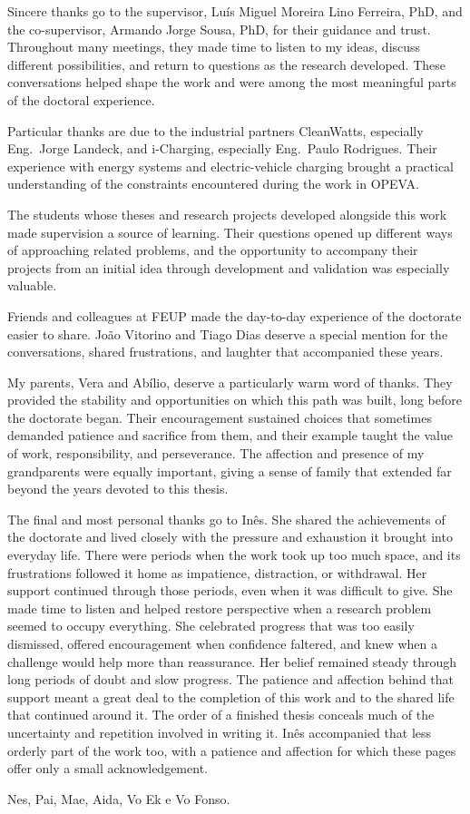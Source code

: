 
Sincere thanks go to the supervisor, Luís Miguel Moreira Lino Ferreira, PhD, and the co-supervisor, Armando Jorge Sousa, PhD, for their guidance and trust. Throughout many meetings, they made time to listen to my ideas, discuss different possibilities, and return to questions as the research developed. These conversations helped shape the work and were among the most meaningful parts of the doctoral experience.

Particular thanks are due to the industrial partners CleanWatts, especially Eng.~Jorge Landeck, and i-Charging, especially Eng.~Paulo Rodrigues. Their experience with energy systems and electric-vehicle charging brought a practical understanding of the constraints encountered during the work in OPEVA.

The students whose theses and research projects developed alongside this work made supervision a source of learning. Their questions opened up different ways of approaching related problems, and the opportunity to accompany their projects from an initial idea through development and validation was especially valuable.


Friends and colleagues at FEUP made the day-to-day experience of the doctorate easier to share. João Vitorino and Tiago Dias deserve a special mention for the conversations, shared frustrations, and laughter that accompanied these years.

My parents, Vera and Abílio, deserve a particularly warm word of thanks. They provided the stability and opportunities on which this path was built, long before the doctorate began. Their encouragement sustained choices that sometimes demanded patience and sacrifice from them, and their example taught the value of work, responsibility, and perseverance. The affection and presence of my grandparents were equally important, giving a sense of family that extended far beyond the years devoted to this thesis.

The final and most personal thanks go to Inês. She shared the achievements of the doctorate and lived closely with the pressure and exhaustion it brought into everyday life. There were periods when the work took up too much space, and its frustrations followed it home as impatience, distraction, or withdrawal. Her support continued through those periods, even when it was difficult to give. She made time to listen and helped restore perspective when a research problem seemed to occupy everything. She celebrated progress that was too easily dismissed, offered encouragement when confidence faltered, and knew when a challenge would help more than reassurance. Her belief remained steady through long periods of doubt and slow progress. The patience and affection behind that support meant a great deal to the completion of this work and to the shared life that continued around it. The order of a finished thesis conceals much of the uncertainty and repetition involved in writing it. Inês accompanied that less orderly part of the work too, with a patience and affection for which these pages offer only a small acknowledgement.

Nes, Pai, Mae, Aida, Vo Ek e Vo Fonso.
